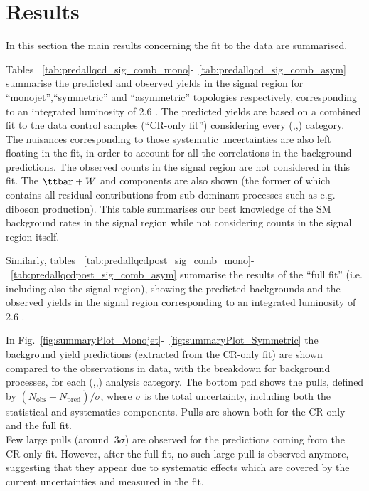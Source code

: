 \section{Results}
\label{sec:results}

In this section the main results concerning the fit to the data are summarised. 

Tables ~\ref{tab:predallqcd_sig_comb_mono}-~\ref{tab:predallqcd_sig_comb_asym} summarise 
the predicted and observed yields in the signal region 
for ``monojet'',``symmetric'' and ``asymmetric'' topologies respectively, 
corresponding to an integrated luminosity of 2.6 \ifb.
The predicted yields are based on a combined fit to the data control samples (``CR-only fit'') considering every (\nj,\nb,\scalht) category. 
The nuisances corresponding to those systematic uncertainties are also left floating in the fit, 
in order to account for all the correlations in the background predictions. 
The observed counts in the signal region are not considered in this fit. 
The $\ttbar+W$ and \znunu components are also shown (the former of which contains all residual contributions from sub-dominant processes such as e.g. diboson production). 
This table summarises our best knowledge of the SM background rates in the signal region while not considering counts in the signal region itself. 

Similarly, tables ~\ref{tab:predallqcdpost_sig_comb_mono}-~\ref{tab:predallqcdpost_sig_comb_asym} summarise the results of the ``full fit'' (i.e. including also the signal region), showing the predicted backgrounds and the observed yields in the signal region corresponding to an integrated luminosity of 2.6 \ifb. 

In Fig.~\ref{fig:summaryPlot_Monojet}-~\ref{fig:summaryPlot_Symmetric} the background yield predictions (extracted from the CR-only fit) 
are shown compared to the observations in data, with the breakdown for background processes, for each (\njet,\nb,\scalht) analysis category. 
The bottom pad shows the pulls, defined by $(N_{\mathrm{obs}}-N_{\mathrm{pred}})/\sigma$, where $\sigma$ is the total uncertainty, 
including both the statistical and systematics components. Pulls are shown both for the CR-only and the full fit. \\
Few large pulls (around $~3\sigma$) are observed for the predictions coming from the CR-only fit. 
However, after the full fit, no such large pull is observed anymore, suggesting that 
they appear due to systematic effects which are covered by the current uncertainties and measured in the fit. 

